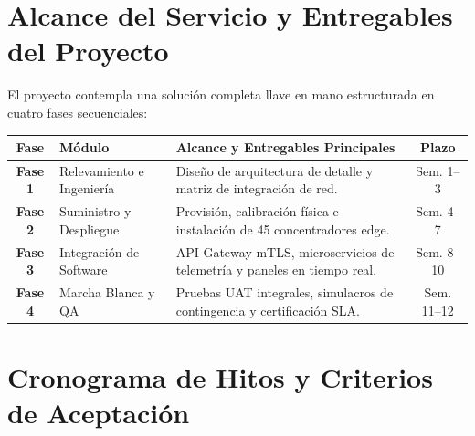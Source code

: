 \documentclass[11pt,letterpaper]{article}
\begin{document}
\newpage

\section{Alcance del Servicio y Entregables del Proyecto}

El proyecto contempla una soluci\'on completa llave en mano estructurada en cuatro fases secuenciales:

\vspace{0.3em}

\noindent
\begin{tabularx}{\linewidth}{@{}c p{3.2cm} X c@{}}
  \toprule
  \textbf{\color{corpPrimary}Fase} & \textbf{\color{corpPrimary}M\'odulo} & \textbf{\color{corpPrimary}Alcance y Entregables Principales} & \textbf{\color{corpPrimary}Plazo} \\
  \midrule
  \textbf{Fase 1} & Relevamiento e Ingenier\'ia & Dise\~no de arquitectura de detalle y matriz de integraci\'on de red. & Sem. 1--3 \\
  \addlinespace[2pt]
  \textbf{Fase 2} & Suministro y Despliegue & Provisi\'on, calibraci\'on f\'isica e instalaci\'on de 45 concentradores edge. & Sem. 4--7 \\
  \addlinespace[2pt]
  \textbf{Fase 3} & Integraci\'on de Software & API Gateway mTLS, microservicios de telemetr\'ia y paneles en tiempo real. & Sem. 8--10 \\
  \addlinespace[2pt]
  \textbf{Fase 4} & Marcha Blanca y QA & Pruebas UAT integrales, simulacros de contingencia y certificaci\'on SLA. & Sem. 11--12 \\
  \bottomrule
\end{tabularx}

\vspace{0.6em}

\section{Cronograma de Hitos y Criterios de Aceptaci\'on}
\end{document}
